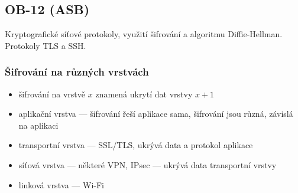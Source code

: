\subsection{OB-12 (ASB)}
Kryptografické síťové protokoly, využití šifrování a algoritmu Diffie-Hellman. Protokoly TLS a SSH.

\subsubsection*{Šifrování na různých vrstvách}
\begin{itemize}
	\item šifrování na vrstvě $x$ znamená ukrytí dat vrstvy $x+1$
	\item aplikační vrstva --- šifrování řeší aplikace sama, šifrování jsou různá, závislá na aplikaci
	\item transportní vrstva --- SSL/TLS, ukrývá data a protokol aplikace
	\item síťová vrstva --- některé VPN, IPsec --- ukrývá data transportní vrstvy
	\item linková vrstva --- Wi-Fi
\end{itemize}

